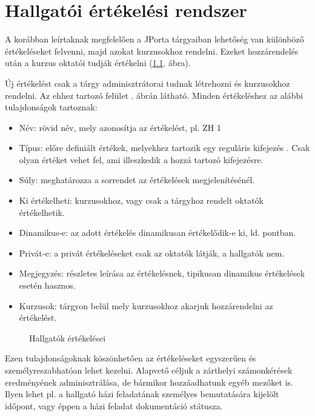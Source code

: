 \chapter{Hallgatói értékelési rendszer}\label{chapter:assessments}

A korábban leírtaknak megfelelően a JPorta tárgyaiban lehetőség van különböző értékeléseket felvenni, majd azokat kurzusokhoz rendelni. Ezeket hozzárendelés után a kurzus oktatói tudják értékelni (\ref{fig:jporta_course_results}. ábra).

Új értékelést csak a tárgy adminisztrátorai tudnak létrehozni és kurzusokhoz rendelni. Az ehhez tartozó felület . ábrán látható. Minden értékeléshez az alábbi tulajdonságok tartoznak:
\begin{itemize}
    \item Név: rövid név, mely azonosítja az értékelést, pl. ZH 1
    \item Típus: előre definiált értékek, melyekhez tartozik egy reguláris kifejezés \cite{RegExp}. Csak olyan értéket vehet fel, ami illeszkedik a hozzá tartozó kifejezésre.
    \item Súly: meghatározza a sorrendet az értékelések megjelenítésénél.
    \item Ki értékelheti: kurzusokhoz, vagy csak a tárgyhoz rendelt oktatók értékelhetik.
    \item Dinamikus-e: az adott értékelés dinamikusan értékelődik-e ki, ld.  pontban.
    \item Privát-e: a privát értékeléseket csak az oktatók látják, a hallgatók nem.
    \item Megjegyzés: részletes leírása az értékelésnek, tipikusan dinamikus értékelések esetén hasznos.
    \item Kurzusok: tárgyon belül mely kurzusokhoz akarjuk hozzárendelni az értékelést.
\end{itemize}

\begin{figure}[h]
    \centering
    \caption{Hallgatók értékelései}
    \label{fig:jporta_course_results}
\end{figure}

Ezen tulajdonságoknak köszönhetően az értékeléseket egyszerűen és személyreszabhatóan lehet kezelni. Alapvető céljuk a zárthelyi számonkérések eredményének adminisztrálása, de bármikor hozzáadhatunk egyéb mezőket is. Ilyen lehet pl. a hallgató házi feladatának személyes bemutatására kijelölt időpont, vagy éppen a házi feladat dokumentáció státusza.

